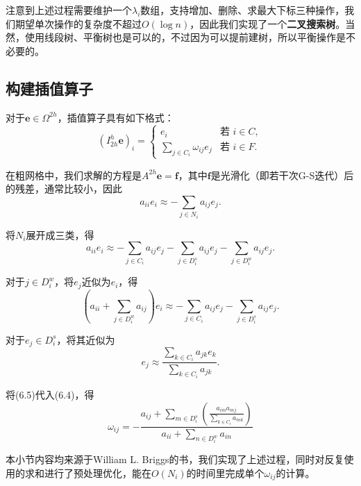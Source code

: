 \documentclass[lang=cn,10pt]{elegantbook}
\begin{document}
注意到上述过程需要维护一个$\lambda_i$数组，支持增加、删除、求最大下标三种操作，我们期望单次操作的复杂度不超过$O(\log n)$，因此我们实现了一个\textbf{二叉搜索树}。当然，使用线段树、平衡树也是可以的，不过因为可以提前建树，所以平衡操作是不必要的。

\subsection{构建插值算子}

对于$\mathbf{e}\in\Omega^{2h}$，插值算子具有如下格式：
\begin{equation}
  (I_{2h}^h \mathbf{e})_i=\left\{
    \begin{array}{ll}
      e_i & \text{若 }i\in C,\\
      \sum_{j\in C_i}\omega_{ij}e_j & \text{若 }i\in F.
    \end{array}
  \right.
\end{equation}

在粗网格中，我们求解的方程是$A^{2h}\mathbf{e}=\mathbf{f}$，其中$\mathbf{f}$是光滑化（即若干次G-S迭代）后的残差，通常比较小，因此
\begin{equation*}
  a_{ii}e_i\approx -\sum_{j\in N_i} a_{ij}e_j.
\end{equation*}

将$N_i$展开成三类，得
\begin{equation}
  a_{ii}e_i\approx -\sum_{j\in C_i} a_{ij}e_j -\sum_{j\in D^s_i} a_{ij}e_j -\sum_{j\in D^w_i} a_{ij}e_j.
\end{equation}

对于$j\in D^w_i$，将$e_j$近似为$e_i$，得
\begin{equation}
  \left(a_{ii}+\sum_{j\in D^w_i} a_{ij}\right)e_i\approx -\sum_{j\in C_i} a_{ij}e_j -\sum_{j\in D^s_i} a_{ij}e_j.
\end{equation}

对于$e_j\in D_i^s$，将其近似为
\begin{equation}
  e_j\approx \frac{\sum_{k\in C_i} a_{jk}e_k}{\sum_{k\in C_i} a_{jk}}.
\end{equation}

将(6.5)代入(6.4)，得
\begin{equation}
  \omega_{ij}=-\frac{a_{ij}+\sum\limits_{m\in D_i^s}\left(\frac{a_{im}a_{mj}}{\sum\limits_{k\in C_i} a_{mk}}\right)}{a_{ii}+\sum\limits_{n\in D_i^w} a_{in}}
\end{equation}

本小节内容均来源于William L. Briggs的书，我们实现了上述过程，同时对反复使用的求和进行了预处理优化，能在$O(N_i)$的时间里完成单个$\omega_{ij}$的计算。
\end{document}
